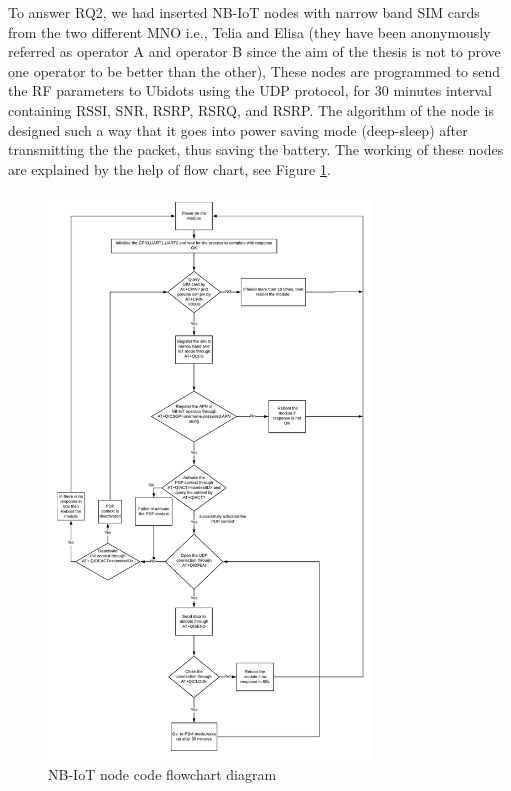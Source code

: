 \documentclass[12pt]{article}
\begin{document}
To answer RQ2, we had inserted NB-IoT nodes with narrow band SIM cards from the two different MNO i.e., Telia and Elisa (they have been anonymously referred as operator A and operator B since the aim of the thesis is not to prove one operator to be better than the other), These nodes are programmed to send the RF parameters to Ubidots using the UDP protocol, for 30 minutes interval containing RSSI, SNR, RSRP, RSRQ, and RSRP. The algorithm of the node is designed such a way that it goes into power saving mode (deep-sleep) after transmitting the the packet, thus saving the battery. The working of these nodes are explained by the help of flow chart, see Figure \ref{fig:NB-IoT node code flowchart diagram}. 


\begin{figure}[H]
    \centering
    \includegraphics[width=0.8\columnwidth,height=15cm]{nbiotFlowchart.pdf}
    \caption{NB-IoT node code flowchart diagram}
    \label{fig:NB-IoT node code flowchart diagram}
\end{figure}
\end{document}
